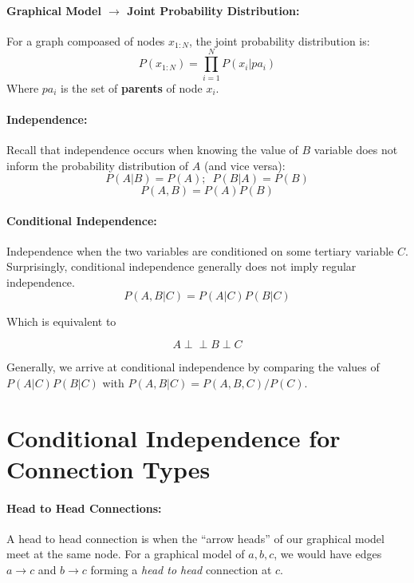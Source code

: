 \documentclass[a4paper,12pt]{report}
\begin{document}
\paragraph{Graphical Model $\to$ Joint Probability Distribution: } For a graph compoased of nodes $x_{1:N}$, the joint probability distribution is:
\begin{equation}
P(x_{1:N}) = \prod_{i=1}^N P(x_i | pa_i)
\end{equation}
Where $pa_i$ is the set of \textbf{parents} of node $x_i$.


\paragraph{Independence: } Recall that independence occurs when knowing the value of $B$ variable does not inform the probability distribution of $A$ (and vice versa):
\begin{equation}
P(A|B) = P(A); \,\,\, P(B|A) = P(B)
\end{equation}
\begin{equation}
P(A,B)= P(A)P(B)
\end{equation}
\paragraph{Conditional Independence: } Independence when the two variables are conditioned on some tertiary variable $C$. Surprisingly, conditional independence generally does not imply regular independence.
\begin{equation}
P(A,B|C) = P(A|C)P(B|C)
\end{equation}

Which is equivalent to 

\newcommand\ci{\perp\!\!\!\perp}

\begin{equation}
A \ci B \perp C
\end{equation}

Generally, we arrive at conditional independence by comparing the values of $P(A|C)P(B|C)$ with $P(A,B|C) = P(A,B,C)/P(C)$.


\section{Conditional Independence for Connection Types}

\paragraph{Head to Head Connections: } A head to head connection is when the ``arrow heads'' of our graphical model meet at the same node. For a graphical model of $a,b,c$, we would have edges $a\to c$ and $b\to c$ forming a \textit{head to head} connection at $c$.
\end{document}
